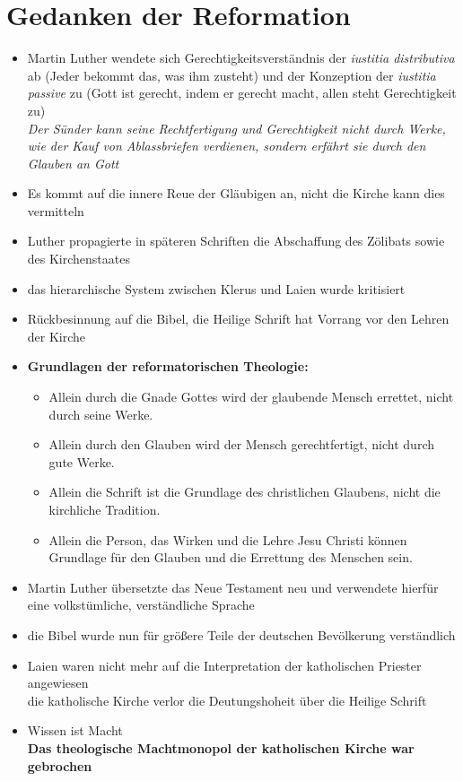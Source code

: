 \documentclass[11pt,a4paper]{article}
\begin{document}
\section*{\textsf{Gedanken der Reformation}}

\begin{itemize}
\item Martin Luther wendete sich Gerechtigkeitsverständnis der \textsl{iustitia distributiva} ab (Jeder bekommt das, was ihm zusteht) und der Konzeption der \textsl{iustitia passive} zu (Gott ist gerecht, indem er gerecht macht, allen steht Gerechtigkeit zu)\\
 \textsl{Der Sünder kann seine Rechtfertigung und Gerechtigkeit nicht durch Werke, wie der Kauf von Ablassbriefen verdienen, sondern erfährt sie durch den Glauben an Gott}
\item Es kommt auf die innere Reue der Gläubigen an, nicht die Kirche kann dies vermitteln
\item Luther propagierte in späteren Schriften die Abschaffung des Zölibats sowie des Kirchenstaates
\item das hierarchische System zwischen Klerus und Laien wurde kritisiert
\item Rückbesinnung auf die Bibel, die Heilige Schrift hat Vorrang vor den Lehren der Kirche

\item \textbf{Grundlagen der reformatorischen Theologie:}

	\begin{itemize}
	\item Allein durch die Gnade Gottes wird der glaubende Mensch errettet, nicht durch seine Werke.
	\item Allein durch den Glauben wird der Mensch gerechtfertigt, nicht durch gute Werke.
	\item Allein die Schrift ist die Grundlage des christlichen Glaubens, nicht die kirchliche Tradition.
	\item Allein die Person, das Wirken und die Lehre Jesu Christi können Grundlage für den Glauben und die Errettung des Menschen sein.
	\end{itemize}

\item Martin Luther übersetzte das Neue Testament neu und verwendete hierfür eine volkstümliche, verständliche Sprache
\item die Bibel wurde nun für größere Teile der deutschen Bevölkerung verständlich
\item Laien waren nicht mehr auf die Interpretation der katholischen Priester angewiesen\\
 die katholische Kirche verlor die Deutungshoheit über die Heilige Schrift
\item Wissen ist Macht\\
 \textbf{Das theologische Machtmonopol der katholischen Kirche war gebrochen}



\end{itemize}
\end{document}
